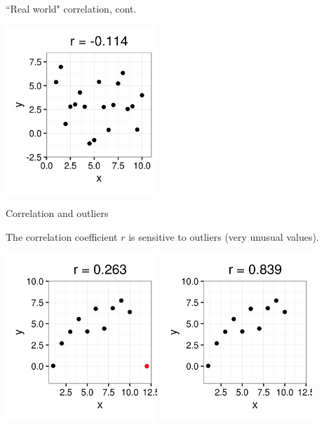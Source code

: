 \documentclass[xcolor=table, handout]{beamer}
\begin{document}
\begin{frame}{``Real world" correlation, cont.}

{\centering
\includegraphics[width=2.25in]{../images/ch10_cor_zero2}
\par}
\end{frame}

\begin{frame}{Correlation and outliers}
\begin{block}{}
The correlation coefficient $r$ is sensitive to outliers (very unusual values).
\end{block}
{\centering
\includegraphics[width=2.25in]{../images/ch10_cor_w_out}
\pause\includegraphics[width=2.25in]{../images/ch10_cor_wo_out}
\par}
\end{frame}
\end{document}
